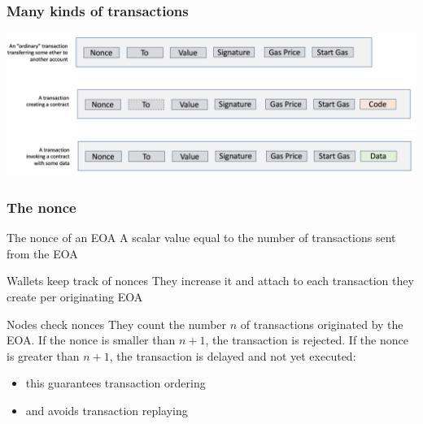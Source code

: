 \documentclass[11pt]{beamer}  %
\begin{document}
\begin{frame}\frametitle{Many kinds of transactions}

  \begin{center}
    \includegraphics[width=\textwidth,clip=false]{pictures/many-transactions.png}
  \end{center}

\end{frame}

\begin{frame}\frametitle{The nonce}

  \begin{greenbox}{The nonce of an EOA}
    A scalar value equal to the number of transactions sent from the EOA
  \end{greenbox}

  \bigskip

  \begin{greenbox}{Wallets keep track of nonces}
    They increase it and attach to each transaction they create per
    originating EOA
  \end{greenbox}

  \bigskip

  \begin{greenbox}{Nodes check nonces}
    They count the number $n$ of transactions originated
    by the EOA. If the nonce is smaller than $n+1$, the
    transaction is rejected. If the nonce is greater than $n+1$,
    the transaction is delayed and not yet executed:
    \begin{itemize}
    \item this guarantees transaction ordering
    \item and avoids transaction replaying
    \end{itemize}
  \end{greenbox}

\end{frame}
\end{document}
